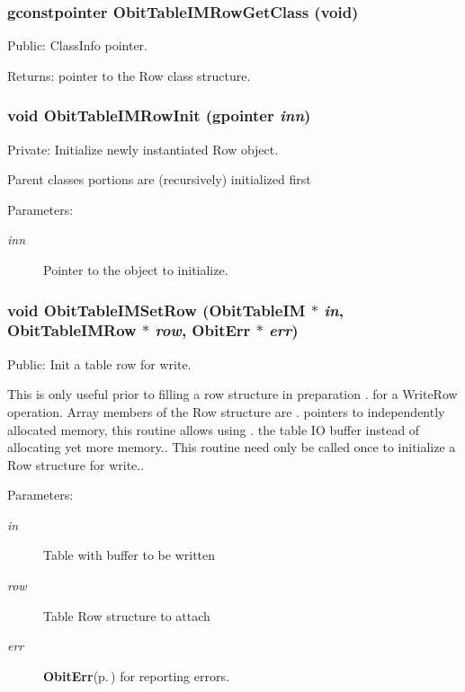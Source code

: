 \subsubsection{\setlength{\rightskip}{0pt plus 5cm}gconstpointer Obit\-Table\-IMRow\-Get\-Class (void)}\label{ObitTableIM_8c_a15}


Public: Class\-Info pointer. 

\begin{Desc}
\item[Returns:]pointer to the Row class structure. \end{Desc}
\subsubsection{\setlength{\rightskip}{0pt plus 5cm}void Obit\-Table\-IMRow\-Init (gpointer {\em inn})}\label{ObitTableIM_8c_a6}


Private: Initialize newly instantiated Row object. 

Parent classes portions are (recursively) initialized first \begin{Desc}
\item[Parameters:]
\begin{description}
\item[{\em inn}]Pointer to the object to initialize. \end{description}
\end{Desc}
\subsubsection{\setlength{\rightskip}{0pt plus 5cm}void Obit\-Table\-IMSet\-Row ({\bf Obit\-Table\-IM} $\ast$ {\em in}, {\bf Obit\-Table\-IMRow} $\ast$ {\em row}, {\bf Obit\-Err} $\ast$ {\em err})}\label{ObitTableIM_8c_a23}


Public: Init a table row for write. 

This is only useful prior to filling a row structure in preparation . for a Write\-Row operation. Array members of the Row structure are . pointers to independently allocated memory, this routine allows using . the table IO buffer instead of allocating yet more memory.. This routine need only be called once to initialize a Row structure for write.. \begin{Desc}
\item[Parameters:]
\begin{description}
\item[{\em in}]Table with buffer to be written \item[{\em row}]Table Row structure to attach \item[{\em err}]{\bf Obit\-Err}{\rm (p.\,\pageref{structObitErr})} for reporting errors. \end{description}
\end{Desc}
